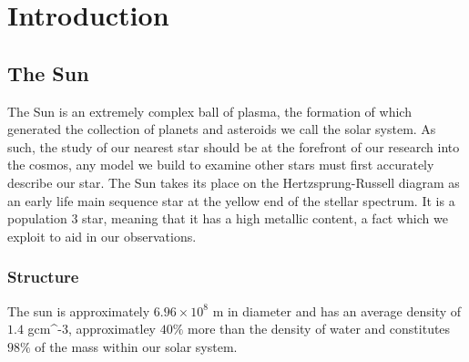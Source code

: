 \label{ch:Intro}
\chapter{Introduction}  %





\section{The Sun}
The Sun is an extremely complex ball of plasma, the formation of which generated the collection of planets and asteroids we call the solar system.
As such, the study of our nearest star should be at the forefront of our research into the cosmos, any model we build to examine other stars must first accurately describe our star. 
The Sun takes its place on the Hertzsprung-Russell diagram as an early life main sequence star at the yellow end of the stellar spectrum.
It is a population 3 star, meaning that it has a high metallic content, a fact which we exploit to aid in our observations.

\subsection{Structure}
The sun is approximately $6.96 \times 10^{8}$ m in diameter and has an average density of $1.4$ gcm^{-3}, approximatley $40\%$ more than the density of water and constitutes $98\%$ of the mass within our solar system.


